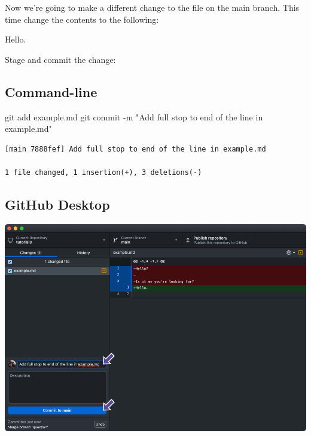 \documentclass[
  letterpaper,
  DIV=11,
  numbers=noendperiod]{scrartcl}
\newenvironment{Shaded}{\begin{snugshade}}{\end{snugshade}}
\newcommand{\NormalTok}[1]{\textcolor[rgb]{0.00,0.23,0.31}{#1}}
\newcommand{\SpecialCharTok}[1]{\textcolor[rgb]{0.37,0.37,0.37}{#1}}
\newcommand{\StringTok}[1]{\textcolor[rgb]{0.13,0.47,0.30}{#1}}
\begin{document}
Now we're going to make a different change to the file on the main
branch. This time change the contents to the following:

\begin{tcolorbox}[enhanced jigsaw, toprule=.15mm, coltitle=black, opacitybacktitle=0.6, leftrule=.75mm, bottomrule=.15mm, colframe=quarto-callout-note-color-frame, titlerule=0mm, title=\textcolor{quarto-callout-note-color}{\faInfo}\hspace{0.5em}{example.md}, colback=white, breakable, opacityback=0, left=2mm, colbacktitle=quarto-callout-note-color!10!white, toptitle=1mm, bottomtitle=1mm, arc=.35mm, rightrule=.15mm]

Hello.

\end{tcolorbox}

Stage and commit the change:

\subsection{Command-line}

\begin{Shaded}
\begin{Highlighting}[]
\NormalTok{git add example.md}
\NormalTok{git commit }\SpecialCharTok{{-}}\NormalTok{m }\StringTok{"Add full stop to end of the line in example.md"}
\end{Highlighting}
\end{Shaded}

\begin{verbatim}
[main 7888fef] Add full stop to end of the line in example.md

1 file changed, 1 insertion(+), 3 deletions(-)
\end{verbatim}

\subsection{GitHub Desktop}

\includegraphics{images/image50.png}
\end{document}

